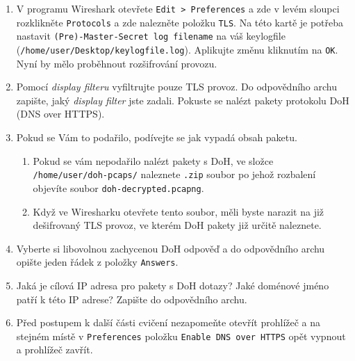 \begin{enumerate}
    \item V programu Wireshark otevřete \texttt{Edit > Preferences} a zde v levém sloupci rozklikněte \texttt{Protocols} a zde nalezněte položku \texttt{TLS}. Na této kartě je potřeba nastavit \texttt{(Pre)-Master-Secret log filename} na váš keylogfile (\texttt{/home/user/Desktop/keylogfile.log}). Aplikujte změnu kliknutím na \texttt{OK}. Nyní by mělo proběhnout rozšifrování provozu.
    \item Pomocí \emph{display filteru} vyfiltrujte pouze TLS provoz. Do odpovědního archu zapište, jaký \emph{display filter} jste zadali. Pokuste se nalézt pakety protokolu DoH (DNS over HTTPS).
    \item Pokud se Vám to podařilo, podívejte se jak vypadá obsah paketu.
    \begin{enumerate}
        \item Pokud se vám nepodařilo nalézt pakety s DoH, ve složce \texttt{/home/user/doh-pcaps/} naleznete \texttt{.zip} soubor po jehož rozbalení objevíte soubor \texttt{doh-decrypted.pcapng}.
        \item Když ve Wiresharku otevřete tento soubor, měli byste narazit na již dešifrovaný TLS provoz, ve kterém DoH pakety již určitě naleznete.
    \end{enumerate}
	\item Vyberte si libovolnou zachycenou DoH odpověď a do odpovědního archu opište jeden řádek z položky \texttt{Answers}.
	\item Jaká je cílová IP adresa pro pakety s DoH dotazy? Jaké doménové jméno patří k této IP adrese? Zapište do odpovědního archu.
    \item Před postupem k další části cvičení nezapomeňte otevřít prohlížeč a na stejném místě v \texttt{Preferences} položku \texttt{Enable DNS over HTTPS} opět vypnout a prohlížeč zavřít.
\end{enumerate}



